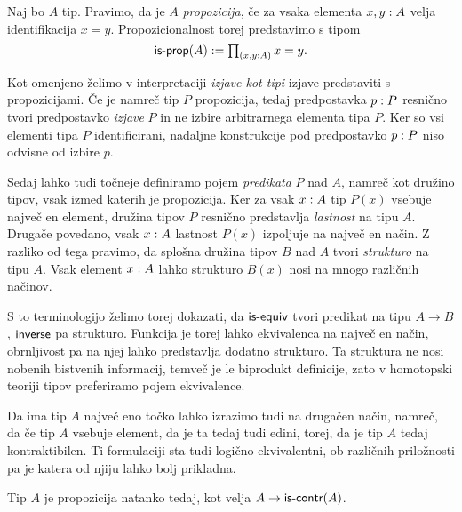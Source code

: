 \begin{definicija}
  Naj bo \(A\) tip. Pravimo, da je \(A\) \emph{propozicija}, če za vsaka elementa \({x, y : A}\) velja identifikacija \(x = y\). Propozicionalnost torej predstavimo s tipom \[\textnormal{\textsf{is-prop}}(A) := \textstyle \prod_{\left( {x, y : A} \right)} x = y.\]
\end{definicija}
\begin{opomba}
Kot omenjeno želimo v interpretaciji \emph{izjave kot tipi} izjave predstaviti s propozicijami. Če je namreč tip \(P\) propozicija, tedaj predpostavka \({p : P}\) resnično tvori predpostavko \emph{izjave} \(P\) in ne izbire arbitrarnega elementa tipa \(P\). Ker so vsi elementi tipa \(P\) identificirani, nadaljne konstrukcije pod predpostavko \({p : P}\) niso odvisne od izbire \(p\).

Sedaj lahko tudi točneje definiramo pojem \emph{predikata} \(P\) nad \(A\), namreč kot družino tipov, vsak izmed katerih je propozicija. Ker za vsak \({x : A}\) tip \(P(x)\) vsebuje največ en element, družina tipov \(P\) resnično predstavlja \emph{lastnost} na tipu \(A\). Drugače povedano, vsak \({x : A}\) lastnost \(P(x)\) izpoljuje na največ en način. Z razliko od tega pravimo, da splošna družina tipov \(B\) nad \(A\) tvori \emph{strukturo} na tipu \(A\). Vsak element \({x : A}\) lahko strukturo \(B(x)\) nosi na mnogo različnih načinov.

S to terminologijo želimo torej dokazati, da \(\textnormal{\textsf{is-equiv}}\) tvori predikat na tipu \(A \to B\), \(\textnormal{\textsf{inverse}}\) pa strukturo. Funkcija je torej lahko ekvivalenca na največ en način, obrnljivost pa na njej lahko predstavlja dodatno strukturo. Ta struktura ne nosi nobenih bistvenih informacij, temveč je le biprodukt definicije, zato v homotopski teoriji tipov preferiramo pojem ekvivalence.
\end{opomba}

Da ima tip \(A\) največ eno točko lahko izrazimo tudi na drugačen način, namreč, da če tip \(A\) vsebuje element, da je ta tedaj tudi edini, torej, da je tip \(A\) tedaj kontraktibilen. Ti formulaciji sta tudi logično ekvivalentni, ob različnih priložnosti pa je katera od njiju lahko bolj prikladna.

\begin{trditev}
  Tip \(A\) je propozicija natanko tedaj, kot velja \(A \to \textnormal{\textsf{is-contr}}(A)\).
\end{trditev}

